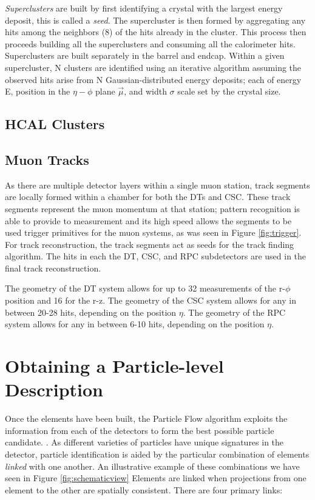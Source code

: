 \textit{Superclusters} are built by first identifying a crystal with the largest energy deposit, this is called a \textit{seed}. The supercluster is then formed by aggregating any hits among the neighbors (8) of the hits already in the cluster. This process then proceeds building all the superclusters and consuming all the calorimeter hits. Superclusters are built separately in the barrel and endcap. Within a given supercluster, N clusters are identified using an iterative algorithm assuming the observed hits arise from N Gaussian-distributed energy deposits; each of energy E, position in the $\eta-\phi$ plane $\vec{\mu}$, and width $\sigma$ scale set by the crystal size.

\subsection{HCAL Clusters}

\subsection{Muon Tracks}

As there are multiple detector layers within a single muon station, track segments are locally formed within a chamber for both the DTs and CSC. These track segments represent the muon momentum at that station; pattern recognition is able to provide to measurement and its high speed allows the segments to be used trigger primitives for the muon systems, as was seen in Figure \ref{fig:trigger}. For track reconstruction, the track segments act as seeds for the track finding algorithm. The hits in each the DT, CSC, and RPC subdetectors are used in the final track reconstruction.

The geometry of the DT system allows for up to 32 measurements of the r-$\phi$ position and 16 for the r-z. The geometry of the CSC system allows for any in between 20-28 hits, depending on the position $\eta$. The geometry of the RPC system allows for any in between 6-10 hits, depending on the position $\eta$. 

\section{Obtaining a Particle-level Description}

Once the elements have been built, the Particle Flow algorithm exploits the information from each of the detectors to form the best possible particle candidate. \cite{CMS-PRF-14-001}. As different varieties of particles have unique signatures in the detector, particle identification is aided by the particular combination of elements \textit{linked} with one another. An illustrative example of these combinations we have seen in Figure \ref{fig:schematicview}  Elements are linked when projections from one element to the other are spatially consistent. There are four primary links:

